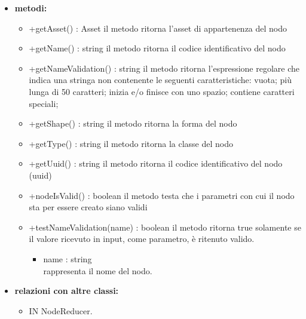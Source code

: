 \begin{itemize}
\begin{itemize}
	\end{itemize}
	\item \textbf{metodi:}
	\begin{itemize}
		\item +getAsset() : Asset\newline
		il metodo ritorna l'asset di appartenenza del nodo
		\item +getName() : string\newline
		il metodo ritorna il codice identificativo del nodo
		\item +getNameValidation() : string\newline
		il metodo ritorna l'espressione regolare che indica una stringa non contenente le seguenti caratteristiche: vuota; più
		lunga di 50 caratteri; inizia e/o finisce con uno spazio; contiene caratteri speciali;
		\item +getShape() : string\newline
		il metodo ritorna la forma del nodo
		\item +getType() : string\newline
		il metodo ritorna la classe del nodo
		\item +getUuid() : string\newline
		il metodo ritorna il codice identificativo del nodo (uuid)
		\item +nodeIsValid() : boolean\newline
		il metodo testa che i parametri con cui il nodo sta per essere creato siano validi
		\item +testNameValidation(name) : boolean\newline
		il metodo ritorna true solamente se il valore ricevuto in input, come parametro, è ritenuto valido.
		\begin{itemize}
			\item name : string\\
			rappresenta il nome del nodo.
		\end{itemize}
	\end{itemize}
	\item \textbf{relazioni con altre classi:} 
	\begin{itemize}
		\item IN NodeReducer.
	\end{itemize}
\end{itemize}
